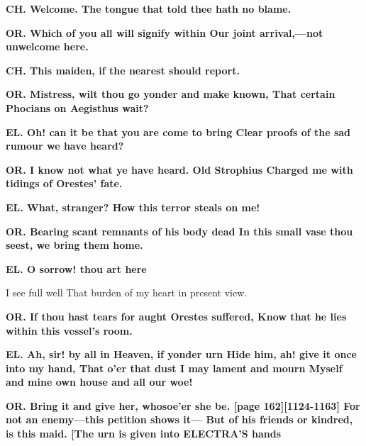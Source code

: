 \documentclass[11pt,letter]{book}
\begin{document}
\par \textbf{CH. Welcome. The tongue that told thee hath no blame.}
\par 

\par \textbf{OR. Which of you all will signify within Our joint arrival,—not unwelcome here.}
\par 

\par \textbf{CH. This maiden, if the nearest should report.}
\par 

\par \textbf{OR. Mistress, wilt thou go yonder and make known, That certain Phocians on Aegisthus wait?}
\par 

\par \textbf{EL. Oh! can it be that you are come to bring Clear proofs of the sad rumour we have heard?}
\par 

\par \textbf{OR. I know not what ye have heard. Old Strophius Charged me with tidings of Orestes’ fate.}
\par 

\par \textbf{EL. What, stranger? How this terror steals on me!}
\par 

\par \textbf{OR. Bearing scant remnants of his body dead In this small vase thou seest, we bring them home.}
\par 

\par \textbf{EL. O sorrow! thou art here}
\par   I see full well That burden of my heart in present view.

\par \textbf{OR. If thou hast tears for aught Orestes suffered, Know that he lies within this vessel’s room.}
\par 

\par \textbf{EL. Ah, sir! by all in Heaven, if yonder urn Hide him, ah! give it once into my hand, That o’er that dust I may lament and mourn Myself and mine own house and all our woe!}
\par 

\par \textbf{OR. Bring it and give her, whosoe’er she be. [page 162][1124-1163] For not an enemy—this petition shows it— But of his friends or kindred, is this maid. [The urn is given into ELECTRA’S hands}
\par 
\end{document}
